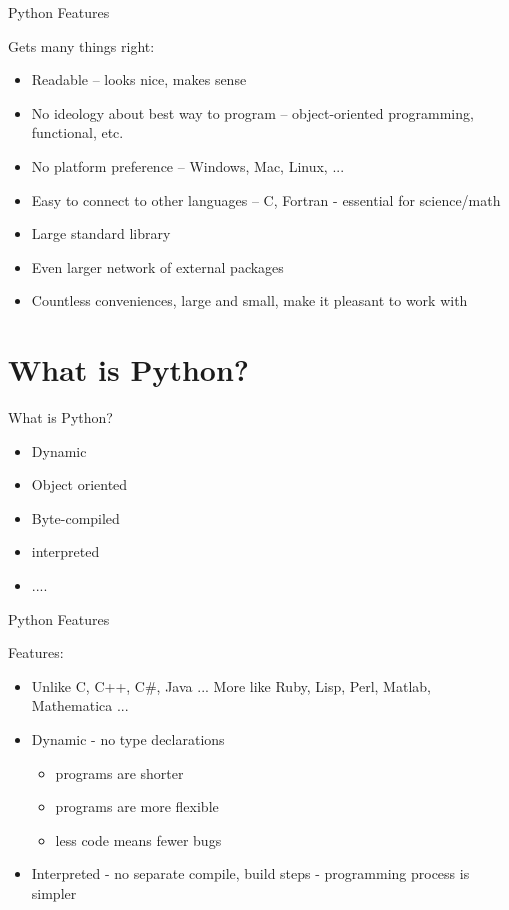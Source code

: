 \documentclass{beamer}
\begin{document}
\begin{frame}{Python Features}
 
{\Large Gets many things right:}
\begin{itemize}
  \item  Readable -- looks nice, makes sense
  \item  No ideology about best way to program -- 
   object-oriented programming,  functional, etc.
  \item  No platform preference -- Windows, Mac, Linux, ...
  \item  Easy to connect to other languages -- C, Fortran - essential for science/math
  \item  Large standard library 
  \item  Even larger network of external packages
  \item  Countless conveniences, large and small, make it pleasant to work with
\end{itemize}
\end{frame}

\section{What is Python?}

\begin{frame}{What is Python?}
    \begin{itemize}
      \item Dynamic
      \item Object oriented
      \item Byte-compiled
      \item interpreted
      \item ....
    \end{itemize}
\end{frame}


\begin{frame}{Python Features}

{\Large Features:}

\begin{itemize}
  \item  Unlike C, C++, C\#, Java ... More like Ruby, Lisp, Perl, Matlab, Mathematica ...
  \item  Dynamic - no type declarations
    \begin{itemize}
      \item programs are shorter
      \item programs are more flexible
      \item less code means fewer bugs
    \end{itemize}
  \item  Interpreted - no separate compile, build steps - programming process is simpler
\end{itemize}

\end{frame}
\end{document}
